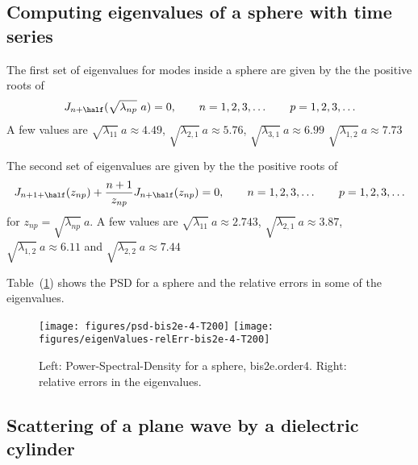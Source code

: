 \clearpage
\subsection{Computing eigenvalues of a sphere with time series}

The first set of eigenvalues for modes inside a sphere are given by the the positive roots of 
\begin{align*}
  J_{n+\half}(\sqrt{\lambda_{np}}~ a)=0 , \qquad n=1,2,3,\ldots \qquad p=1,2,3,\ldots
\end{align*}
A few values are $\sqrt{\lambda_{11}}~ a \approx 4.49$, $\sqrt{\lambda_{2,1}}~ a \approx 5.76$,
$\sqrt{\lambda_{3,1}}~ a \approx 6.99$ 
$\sqrt{\lambda_{1,2}}~ a \approx 7.73$ 


The second set of eigenvalues are given by the the positive roots of 
\begin{align*}
  J_{n+1+\half}(z_{np})
     + {n+1\over z_{np}}J_{n+\half}(z_{np})=0 , 
                \qquad n=1,2,3,\ldots \qquad p=1,2,3,\ldots
\end{align*}
for $z_{np}=\sqrt{\lambda_{np}}~ a$. 
A few values are $\sqrt{\lambda_{11}}~ a \approx 2.743$, $\sqrt{\lambda_{2,1}}~ a \approx 3.87$,
$\sqrt{\lambda_{1,2}}~ a \approx 6.11$ and $\sqrt{\lambda_{2,2}}~ a \approx 7.44$

Table~(\ref{tab:eigSphere}) shows the PSD for a sphere and the relative errors in 
some of the eigenvalues.

\renewcommand{\figWidth}{.475\linewidth}
\begin{figure}
\begin{center}
\texttt{[image: figures/psd-bis2e-4-T200]}
\texttt{[image: figures/eigenValues-relErr-bis2e-4-T200]}
\end{center}
\caption{Left: Power-Spectral-Density for a sphere, bis2e.order4. Right: relative errors in the eigenvalues.}
\label{tab:eigSphere}
\end{figure}


\clearpage
\subsection{Scattering of a plane wave by a dielectric cylinder}

